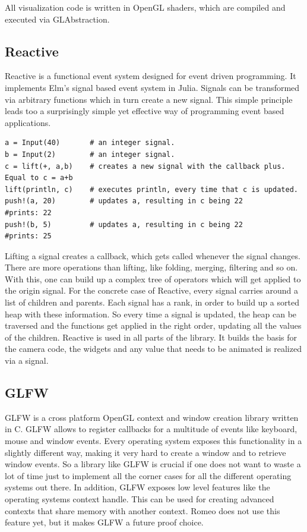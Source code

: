All visualization code is written in OpenGL shaders, which are compiled and executed via GLAbstraction.

\subsection{Reactive}
Reactive\cite{Reactive} is a functional event system designed for event driven programming.
It implements Elm's\cite{Elm} signal based event system in Julia.
Signals can be transformed via arbitrary functions which in turn create a new signal.
This simple principle leads too a surprisingly simple yet effective way of programming event based applications.

\begin{lstlisting}
a = Input(40)       # an integer signal.
b = Input(2)        # an integer signal.
c = lift(+, a,b)    # creates a new signal with the callback plus. Equal to c = a+b
lift(println, c)    # executes println, every time that c is updated. 
push!(a, 20)        # updates a, resulting in c being 22
#prints: 22
push!(b, 5)         # updates a, resulting in c being 22
#prints: 25
\end{lstlisting}

Lifting a signal creates a callback, which gets called whenever the signal changes.
There are more operations than lifting, like folding, merging, filtering and so on.
With this, one can build up a complex tree of operators which will get applied to the origin signal.
For the concrete case of Reactive, every signal carries around a list of children and parents.
Each signal has a rank, in order to build up a sorted heap with these information.
So every time a signal is updated, the heap can be traversed and the functions get applied in the right order, updating all the values of the children.
Reactive is used in all parts of the library. It builds the basis for the camera code, the widgets and any value that needs to be animated is realized via a signal.

\subsection{GLFW}
GLFW\cite{GLFW} is a cross platform \ac{OpenGL} context and window creation library written in C.
GLFW allows to register callbacks for a multitude of events like keyboard, mouse and window events.
Every operating system exposes this functionality in a slightly different way, making it very hard to create a window and to retrieve window events.
So a library like GLFW is crucial if one does not want to waste a lot of time just to implement all the corner cases for all the different operating systems out there.
In addition, GLFW exposes low level features like the operating systems context handle.
This can be used for creating advanced contexts that share memory with another context.
Romeo does not use this feature yet, but it makes GLFW a future proof choice.


